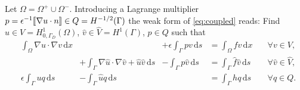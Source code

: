 \documentclass[r]{siamart171218}
\begin{document}
Let $\Omega=\Omega^{+}\cup\Omega^{-}$. Introducing a Lagrange multiplier
$p=\epsilon^{-1}[\![\nabla u \cdot n]\!]\in Q=H^{-1/2}(\Gamma)$
the weak form of \eqref{eq:coupled} reads: Find $u\in V=H^1_{0, \Gamma_D}(\Omega)$,
$\hat{v}\in\hat{V}=H^1(\Gamma)$, $p\in Q$ such that
%
\begin{equation}\label{eq:coupled_weak}
  \begin{aligned}
    &\int_{\Omega}\nabla u\cdot \nabla v\,\mathrm{d}x &\phantom{+\int_{\Gamma}\nabla \hat{u}\cdot \nabla \hat{v}} &+\epsilon\int_{\Gamma} p v\,\mathrm{d}s &= \int_{\Omega}f v\,\mathrm{d}x \quad &\forall v\in V,\\
    &\phantom{\int_{\Omega}\nabla u\cdot \nabla v} &+{\int_{\Gamma}\nabla \hat{u}\cdot \nabla \hat{v} + \hat{u}\hat{v}\,\mathrm{d}s} &-\int_{\Gamma} p\hat{v}\,\mathrm{d}s &= \int_{\Gamma}\hat{f}\hat{v}\,\mathrm{d}s \quad &\forall \hat{v}\in \hat{V},\\
    &\epsilon\int_{\Gamma}u q\,\mathrm{d}s &-\int_{\Gamma}\hat{u}q\,\mathrm{d}s &\phantom{-\int{\Gamma}q\hat{v}} &= \int_{\Gamma}h q\,\mathrm{d}s \quad &\forall q\in Q.
  \end{aligned}
\end{equation}
\end{document}
